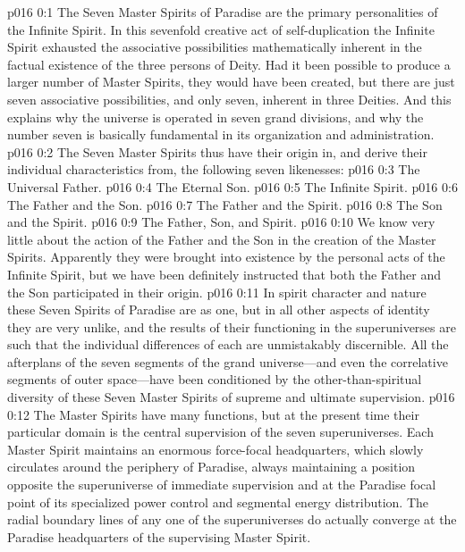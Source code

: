 \author{Universal Censor}
\vs p016 0:1 The Seven Master Spirits of Paradise are the primary personalities of the Infinite Spirit. In this sevenfold creative act of self\hyp{}duplication the Infinite Spirit exhausted the associative possibilities mathematically inherent in the factual existence of the three persons of Deity. Had it been possible to produce a larger number of Master Spirits, they would have been created, but there are just seven associative possibilities, and only seven, inherent in three Deities. And this explains why the universe is operated in seven grand divisions, and why the number seven is basically fundamental in its organization and administration.
\vs p016 0:2 The Seven Master Spirits thus have their origin in, and derive their individual characteristics from, the following seven likenesses:
\pc \vs p016 0:3 \bibnobreakspace The Universal Father.
\vs p016 0:4 \bibnobreakspace The Eternal Son.
\vs p016 0:5 \bibnobreakspace The Infinite Spirit.
\vs p016 0:6 \bibnobreakspace The Father and the Son.
\vs p016 0:7 \bibnobreakspace The Father and the Spirit.
\vs p016 0:8 \bibnobreakspace The Son and the Spirit.
\vs p016 0:9 \bibnobreakspace The Father, Son, and Spirit.
\pc \vs p016 0:10 We know very little about the action of the Father and the Son in the creation of the Master Spirits. Apparently they were brought into existence by the personal acts of the Infinite Spirit, but we have been definitely instructed that both the Father and the Son participated in their origin.
\vs p016 0:11 In spirit character and nature these Seven Spirits of Paradise are as one, but in all other aspects of identity they are very unlike, and the results of their functioning in the superuniverses are such that the individual differences of each are unmistakably discernible. All the afterplans of the seven segments of the grand universe---and even the correlative segments of outer space---have been conditioned by the other\hyp{}than\hyp{}spiritual diversity of these Seven Master Spirits of supreme and ultimate supervision.
\vs p016 0:12 The Master Spirits have many functions, but at the present time their particular domain is the central supervision of the seven superuniverses. Each Master Spirit maintains an enormous force\hyp{}focal headquarters, which slowly circulates around the periphery of Paradise, always maintaining a position opposite the superuniverse of immediate supervision and at the Paradise focal point of its specialized power control and segmental energy distribution. The radial boundary lines of any one of the superuniverses do actually converge at the Paradise headquarters of the supervising Master Spirit.
